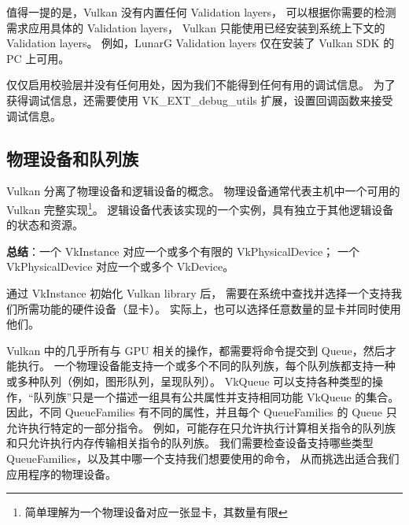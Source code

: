\documentclass[a4paper, 12pt]{ctexart}
\begin{document}
    值得一提的是，Vulkan 没有内置任何 Validation layers，
    可以根据你需要的检测需求应用具体的 Validation layers，
    Vulkan 只能使用已经安装到系统上下文的 Validation layers。
    例如，LunarG Validation layers 仅在安装了 Vulkan SDK 的 PC 上可用。



    

    仅仅启用校验层并没有任何用处，因为我们不能得到任何有用的调试信息。
    为了获得调试信息，还需要使用 VK\_EXT\_debug\_utils 扩展，设置回调函数来接受调试信息。


\clearpage
\subsection{物理设备和队列族}
    Vulkan 分离了物理设备和逻辑设备的概念。
    物理设备通常代表主机中一个可用的 Vulkan 完整实现\footnote{简单理解为一个物理设备对应一张显卡，其数量有限}。
    逻辑设备代表该实现的一个实例，具有独立于其他逻辑设备的状态和资源。
    
    \textbf{总结}：一个 VkInstance 对应一个或多个有限的 VkPhysicalDevice；
    一个 VkPhysicalDevice 对应一个或多个 VkDevice。
    
    通过 VkInstance 初始化 Vulkan library 后，
    需要在系统中查找并选择一个支持我们所需功能的硬件设备（显卡）。
    实际上，也可以选择任意数量的显卡并同时使用他们。

    Vulkan 中的几乎所有与 GPU 相关的操作，都需要将命令提交到 Queue，然后才能执行。
    一个物理设备能支持一个或多个不同的队列族，每个队列族都支持一种或多种队列（例如，图形队列，呈现队列）。
    VkQueue 可以支持各种类型的操作，“队列族”只是一个描述一组具有公共属性并支持相同功能 VkQueue 的集合。
    因此，不同 QueueFamilies 有不同的属性，并且每个 QueueFamilies 的 Queue 只允许执行特定的一部分指令。
    例如，可能存在只允许执行计算相关指令的队列族和只允许执行内存传输相关指令的队列族。
    我们需要检查设备支持哪些类型 QueueFamilies，以及其中哪一个支持我们想要使用的命令，
    从而挑选出适合我们应用程序的物理设备。
\end{document}
